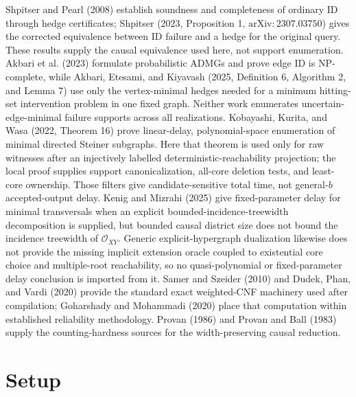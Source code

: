 \documentclass{article}
\begin{document}
Shpitser and Pearl (2008) establish soundness and completeness of ordinary ID through hedge certificates; Shpitser (2023, Proposition 1, \(\mathrm{arXiv}:2307.03750\)) gives the corrected equivalence between ID failure and a hedge for the original query.  These results supply the causal equivalence used here, not support enumeration.  Akbari et al. (2023) formulate probabilistic ADMGs and prove edge ID is NP-complete, while Akbari, Etesami, and Kiyavash (2025, Definition 6, Algorithm 2, and Lemma 7) use only the vertex-minimal hedges needed for a minimum hitting-set intervention problem in one fixed graph.  Neither work enumerates uncertain-edge-minimal failure supports across all realizations.  Kobayashi, Kurita, and Wasa (2022, Theorem 16) prove linear-delay, polynomial-space enumeration of minimal directed Steiner subgraphs.  Here that theorem is used only for raw witnesses after an injectively labelled deterministic-reachability projection; the local proof supplies support canonicalization, all-core deletion tests, and least-core ownership.  Those filters give candidate-sensitive total time, not general-\(b\) accepted-output delay.  Kenig and Mizrahi (2025) give fixed-parameter delay for minimal transversals when an explicit bounded-incidence-treewidth decomposition is supplied, but bounded causal district size does not bound the incidence treewidth of \(\mathcal O_{XY}\).  Generic explicit-hypergraph dualization likewise does not provide the missing implicit extension oracle coupled to existential core choice and multiple-root reachability, so no quasi-polynomial or fixed-parameter delay conclusion is imported from it.  Samer and Szeider (2010) and Dudek, Phan, and Vardi (2020) provide the standard exact weighted-CNF machinery used after compilation; Goharshady and Mohammadi (2020) place that computation within established reliability methodology.  Provan (1986) and Provan and Ball (1983) supply the counting-hardness sources for the width-preserving causal reduction.

\section{Setup}
\end{document}
